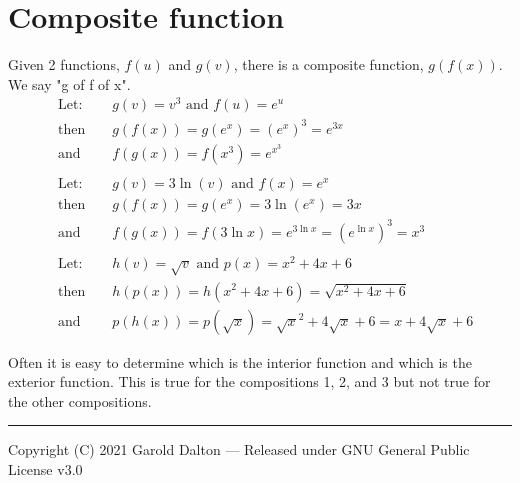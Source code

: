 \documentclass[14pt]{extarticle}
\begin{document}
\section*{Composite function}
Given 2 functions, $f(u)$ and $g(v)$, there is a composite function, $g(f(x))$. We say "g of f of x".
\begin{align*}
	&\text{Let:} & &g(v) = v^3 \text{ and } f(u) = e^u \\
	&\text{then } & &g(f(x)) = g(e^x) = (e^x)^3 = e^{3x} \tag{1}\\
	&\text{and } & &f(g(x)) = f(x^3) = e^{x^3}	\tag{2}
\\\\
	&\text{Let:} & &g(v) = 3\ln(v) \text{ and } f(x) = e^x \\
	&\text{then } & &g(f(x)) = g(e^x) = 3\ln(e^x) = 3x \\
	&\text{and } & &f(g(x)) = f(3\ln x) = e^{3\ln x} = (e^{\ln x})^3 = x^3
\\\\
	&\text{Let:} & &h(v) = \sqrt{v} \text{ and } p(x) = x^2 + 4x + 6 \\
	&\text{then } & &h(p(x)) = h(x^2 + 4x + 6) = \sqrt{x^2 + 4x + 6} \tag{3}\\
	&\text{and } & &p(h(x)) = p(\sqrt{x}) = \sqrt{x}^2 +4\sqrt{x}+6 = x+4\sqrt{x}+6
\end{align*}

Often it is easy to determine which is the interior function and which is the exterior function. This is true for the compositions 1, 2, and 3 but not true for the other compositions.

\noindent\rule{\textwidth}{1pt}
{\footnotesize Copyright (C) 2021 Garold Dalton --- Released under GNU General Public License v3.0}


\cleardoublepage
\end{document}

